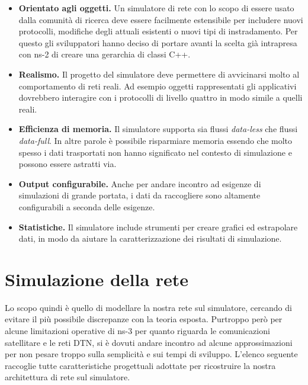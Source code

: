 \documentclass[12pt,a4paper,oneside]{book}
\begin{document}
		\begin{itemize}
			\item {\bf Orientato agli oggetti.} Un simulatore di rete con lo scopo di essere usato dalla comunità di ricerca deve essere facilmente estensibile per includere nuovi protocolli, modifiche degli attuali esistenti o nuovi tipi di instradamento. Per questo gli sviluppatori hanno deciso di portare avanti la scelta già intrapresa con ns-2 di creare una gerarchia di classi C++.
			
			\item {\bf Realismo.} Il progetto del simulatore deve permettere di avvicinarsi molto al comportamento di reti reali. Ad esempio oggetti rappresentati gli applicativi dovrebbero interagire con i protocolli di livello quattro in modo simile a quelli reali.
			
			\item {\bf Efficienza di memoria.} Il simulatore supporta sia flussi {\it data-less} che flussi {\it data-full}. In altre parole è possibile risparmiare memoria essendo che molto spesso i dati trasportati non hanno significato nel contesto di simulazione e possono essere astratti via.
			
			\item {\bf Output configurabile.} Anche per andare incontro ad esigenze di simulazioni di grande portata, i dati da raccogliere sono altamente configurabili a seconda delle esigenze.
			
			\item {\bf Statistiche.} Il simulatore include strumenti per creare grafici ed estrapolare dati, in modo da aiutare la caratterizzazione dei risultati di simulazione.
		\end{itemize}
		
		\section{Simulazione della rete} \label{simRete}
		Lo scopo quindi è quello di modellare la nostra rete sul simulatore, cercando di evitare il più possibile discrepanze con la teoria esposta. Purtroppo però per alcune limitazioni operative di ns-3 per quanto riguarda le comunicazioni satellitare e le reti DTN, si è dovuti andare incontro ad alcune approssimazioni per non pesare troppo sulla semplicità e sui tempi di sviluppo. L'elenco seguente raccoglie tutte caratteristiche progettuali adottate per ricostruire la nostra architettura di rete sul simulatore. 
		
\end{document}
